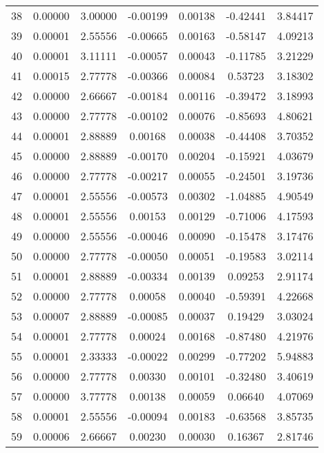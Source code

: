 \begin{longtable}{c c c c c c c}
38  &  0.00000 &      3.00000 & -0.00199 &   0.00138 &  -0.42441 &   3.84417 \\
39  &  0.00001 &      2.55556 & -0.00665 &   0.00163 &  -0.58147 &   4.09213 \\
40  &  0.00001 &      3.11111 & -0.00057 &   0.00043 &  -0.11785 &   3.21229 \\
41  &  0.00015 &      2.77778 & -0.00366 &   0.00084 &   0.53723 &   3.18302 \\
42  &  0.00000 &      2.66667 & -0.00184 &   0.00116 &  -0.39472 &   3.18993 \\
43  &  0.00000 &      2.77778 & -0.00102 &   0.00076 &  -0.85693 &   4.80621 \\
44  &  0.00001 &      2.88889 &  0.00168 &   0.00038 &  -0.44408 &   3.70352 \\
45  &  0.00000 &      2.88889 & -0.00170 &   0.00204 &  -0.15921 &   4.03679 \\
46  &  0.00000 &      2.77778 & -0.00217 &   0.00055 &  -0.24501 &   3.19736 \\
47  &  0.00001 &      2.55556 & -0.00573 &   0.00302 &  -1.04885 &   4.90549 \\
48  &  0.00001 &      2.55556 &  0.00153 &   0.00129 &  -0.71006 &   4.17593 \\
49  &  0.00000 &      2.55556 & -0.00046 &   0.00090 &  -0.15478 &   3.17476 \\
50  &  0.00000 &      2.77778 & -0.00050 &   0.00051 &  -0.19583 &   3.02114 \\
51  &  0.00001 &      2.88889 & -0.00334 &   0.00139 &   0.09253 &   2.91174 \\
52  &  0.00000 &      2.77778 &  0.00058 &   0.00040 &  -0.59391 &   4.22668 \\
53  &  0.00007 &      2.88889 & -0.00085 &   0.00037 &   0.19429 &   3.03024 \\
54  &  0.00001 &      2.77778 &  0.00024 &   0.00168 &  -0.87480 &   4.21976 \\
55  &  0.00001 &      2.33333 & -0.00022 &   0.00299 &  -0.77202 &   5.94883 \\
56  &  0.00000 &      2.77778 &  0.00330 &   0.00101 &  -0.32480 &   3.40619 \\
57  &  0.00000 &      3.77778 &  0.00138 &   0.00059 &   0.06640 &   4.07069 \\
58  &  0.00001 &      2.55556 & -0.00094 &   0.00183 &  -0.63568 &   3.85735 \\
59  &  0.00006 &      2.66667 &  0.00230 &   0.00030 &   0.16367 &   2.81746 \\

\end{longtable}
